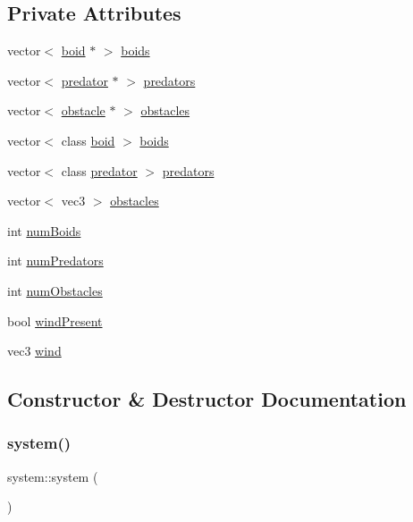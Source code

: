 \subsection*{Private Attributes}
\begin{DoxyCompactItemize}
\item 
vector$<$ \mbox{\hyperlink{classboid}{boid}} $\ast$ $>$ \mbox{\hyperlink{classsystem_a793bb926129ed3a0e339963f7c946b38}{boids}}
\item 
vector$<$ \mbox{\hyperlink{classpredator}{predator}} $\ast$ $>$ \mbox{\hyperlink{classsystem_ae556f3461a2634c20cdfecab252fd630}{predators}}
\item 
vector$<$ \mbox{\hyperlink{classobstacle}{obstacle}} $\ast$ $>$ \mbox{\hyperlink{classsystem_a5e8f34728aeb927417ab652862d0421c}{obstacles}}
\item 
vector$<$ class \mbox{\hyperlink{classboid}{boid}} $>$ \mbox{\hyperlink{classsystem_a5434f282e08d337d1d9df5494bc69e1a}{boids}}
\item 
vector$<$ class \mbox{\hyperlink{classpredator}{predator}} $>$ \mbox{\hyperlink{classsystem_a6df80b386b3e1d1e2167253032257bb5}{predators}}
\item 
vector$<$ vec3 $>$ \mbox{\hyperlink{classsystem_a992fe06ffffddcfcf04910519d09f7f8}{obstacles}}
\item 
int \mbox{\hyperlink{classsystem_aed81719a90b3e0f67fef16e08d9f685b}{num\+Boids}}
\item 
int \mbox{\hyperlink{classsystem_a024864bf6468dd241cd5aa590842796d}{num\+Predators}}
\item 
int \mbox{\hyperlink{classsystem_a4ffd76e53f9d4d56406f671ecdadc1e3}{num\+Obstacles}}
\item 
bool \mbox{\hyperlink{classsystem_a8a63cc2b9860bde768b6c58758c30f7b}{wind\+Present}}
\item 
vec3 \mbox{\hyperlink{classsystem_af0a770a1cd0b1eef642a2ebef4cafd25}{wind}}
\end{DoxyCompactItemize}


\subsection{Constructor \& Destructor Documentation}
\mbox{\label{classsystem_a1f1b25f81874eb56b3aeff1c8677b163}} 
\subsubsection{\texorpdfstring{system()}{system()}}
{\footnotesize\ttfamily system\+::system (\begin{DoxyParamCaption}{ }\end{DoxyParamCaption})}



